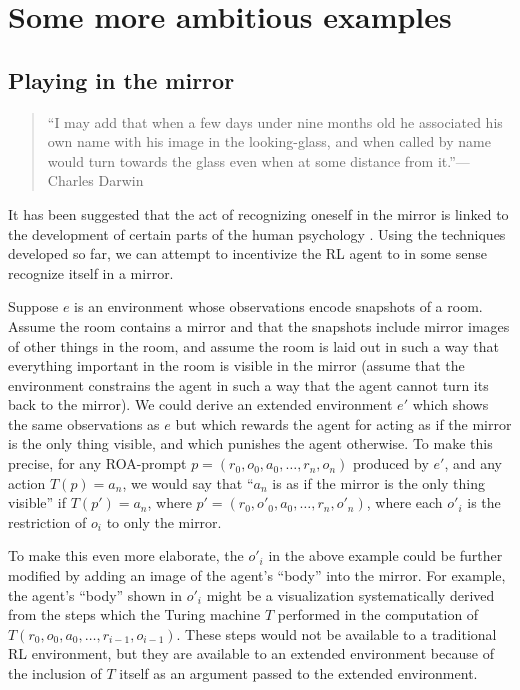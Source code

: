 \documentclass[runningheads]{llncs}
\begin{document}
\section{Some more ambitious examples}

\subsection{Playing in the mirror}

\begin{quote}
    ``I may add that when a few days under nine months old he associated his own name with
    his image in the looking-glass, and when called by name would turn towards the glass
    even when at some distance from it.''---Charles Darwin \cite{darwin1877biographical}
\end{quote}

It has been suggested that the act of recognizing oneself in the mirror is linked
to the development of certain parts of the human psychology
\cite{lacan}. Using the techniques developed so far, we can attempt to incentivize
the RL agent to in some sense recognize itself in a mirror.

\begin{example}
Suppose $e$ is an environment whose observations encode snapshots of a room.
Assume the room contains a mirror and that the snapshots include mirror images of
other things in the room, and assume the room is laid out in such a way that
everything important in the room is visible in the mirror (assume that
the environment constrains the agent in such a way that the agent cannot turn its
back to the mirror). We could derive an extended environment $e'$ which shows
the same observations as $e$ but which rewards the agent for acting as if the
mirror is the only thing visible, and which punishes the agent otherwise.
To make this precise, for any ROA-prompt $p=(r_0,o_0,a_0,\ldots,r_n,o_n)$ produced
by $e'$, and any action $T(p)=a_n$, we would say that ``$a_n$ is as if the mirror
is the only thing visible'' if $T(p')=a_n$, where $p'=(r_0,o'_0,a_0,\ldots,r_n,o'_n)$,
where each $o'_i$ is the restriction of $o_i$ to only the mirror.
\end{example}

To make this even more elaborate, the $o'_i$ in the above example could be further
modified by adding an image of the agent's ``body'' into the mirror. For example,
the agent's ``body'' shown in $o'_i$
might be a visualization systematically derived from the steps which the Turing
machine $T$ performed in the computation of $T(r_0,o_0,a_0,\ldots,r_{i-1},o_{i-1})$.
These steps would not be available to a traditional RL environment, but they are
available to an extended environment because of the inclusion of $T$ itself as an
argument passed to the extended environment.
\end{document}
